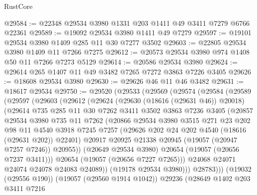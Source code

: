 \begin{lexlean}{RustCore}
\begin{coremodule}
@29584 := @22348 @29534 @3980 @1331 @203 @1411 @49 @3411 @7279 @6766 @22361
@29589 := @19092 @29534 @3980 @1411 @49 @7279
@29597 := @19101 @29534 @3980 @1409 @285 @11 @30 @7277 @3502
@29603 := @22805 @29534 @3980 @1409 @11 @7266 @7275
@29612 := @20573 @29534 @3980 @974 @1408 @50 @11 @7266 @7273 @5129
@29614 := @20586 @29534 @3980
@29624 := @29614 @265 @1407 @11 @49 @3482 @7265 @7272 @3863 @7226 @3405
@29626 := @18608 @29534 @3980
@29630 := @29626 @46 @11 @46 @3482
@29631 := @18617 @29534
@29750 := @29520
    (@29533
      (@29569
        (@29574
          (@29584
            (@29589
              (@29597
                (@29603
                  (@29612
                    (@29624
                      (@29630 (@18616 (@29631 @46)) @20018)
                      (@29614
                        @735
                        @285
                        @11
                        @30
                        @7262
                        @3411
                        @3502
                        @3863
                        @7236
                        @3405
                        (@20857
                          @29534
                          @3980
                          @735
                          @11
                          @7262
                          (@20866
                            @29534
                            @3980
                            @3515
                            @271
                            @23
                            @202
                            @98
                            @11
                            @4540
                            @3918
                            @7245
                            @7257
                            (@29626 @202 @24 @202 @4540 (@18616 (@29631 @202)) @22401)
                            @20917
                            @20925
                            @21338
                            @20945
                            (@19057 (@20947 @7257 @7246))
                            @20955))
                        (@20649 @29534 @3980)
                        @20654
                        (@19057 (@20656 @7237 @3411)))
                      @20654
                      (@19057 (@20656 @7227 @7265)))
                    @24068
                    @24071
                    @24074
                    @24078
                    @24083
                    @24089))
                (@19178 @29534 @3980)))
            @28783)))
      (@19032 (@29556 @190))
      (@19057 (@29560 @1914 @1042))
      @29236
      (@28649
        @1402
        @203
        @3411
        @7216

\end{coremodule}
\end{lexlean}
